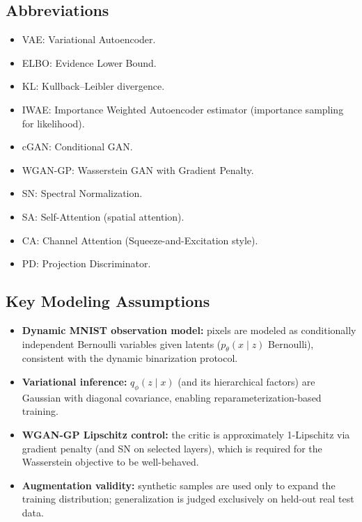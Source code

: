 \subsection{Abbreviations}
\begin{itemize}
  \item VAE: Variational Autoencoder.
  \item ELBO: Evidence Lower Bound.
  \item KL: Kullback--Leibler divergence.
  \item IWAE: Importance Weighted Autoencoder estimator (importance sampling for likelihood).
  \item cGAN: Conditional GAN.
  \item WGAN-GP: Wasserstein GAN with Gradient Penalty.
  \item SN: Spectral Normalization.
  \item SA: Self-Attention (spatial attention).
  \item CA: Channel Attention (Squeeze-and-Excitation style).
  \item PD: Projection Discriminator.
\end{itemize}

\subsection{Key Modeling Assumptions}
\begin{itemize}
  \item \textbf{Dynamic MNIST observation model:} pixels are modeled as conditionally independent Bernoulli variables given latents ($p_\theta(x\mid z)$ Bernoulli), consistent with the dynamic binarization protocol.
  \item \textbf{Variational inference:} $q_\phi(z\mid x)$ (and its hierarchical factors) are Gaussian with diagonal covariance, enabling reparameterization-based training.
  \item \textbf{WGAN-GP Lipschitz control:} the critic is approximately 1-Lipschitz via gradient penalty (and SN on selected layers), which is required for the Wasserstein objective to be well-behaved.
  \item \textbf{Augmentation validity:} synthetic samples are used only to expand the training distribution; generalization is judged exclusively on held-out real test data.
\end{itemize}
